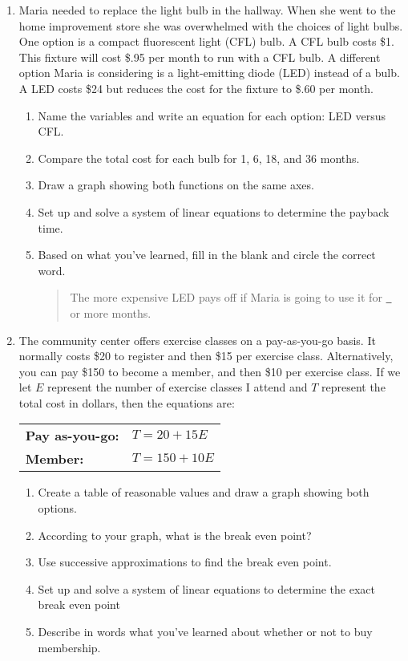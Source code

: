 \begin{enumerate}
\item Maria needed to replace the light bulb in the hallway.  When she went to the home improvement store she was overwhelmed with the choices of light bulbs.  One option is a compact fluorescent light  (CFL) bulb.  A CFL bulb costs \$1.  This fixture will cost \$.95 per month to run with a CFL bulb.  A different option Maria is considering is a light-emitting diode (LED) instead of a bulb.  A LED costs \$24 but reduces the cost for the fixture to  \$.60 per month.    
\begin{enumerate}
\item Name the variables and write an equation for each option: LED versus CFL.
\item Compare the total cost for each bulb for 1, 6, 18, and 36 months.
\item Draw a graph showing both functions on the same axes.
\item Set up and solve a system of linear equations to determine the payback time.
\item Based on what you've learned, fill in the blank and circle the correct word.
\begin{quote}
The more expensive LED pays off if Maria is going to use it for \underline{\quad~}  or more months.  
\end{quote}
\end{enumerate}

\item The community center offers exercise classes on a pay-as-you-go basis.  It normally costs \$20 to register and then \$15 per exercise class.  Alternatively, you can pay \$150 to become a member, and then \$10 per exercise class.  If we let $E$ represent the number of exercise classes I attend and $T$ represent the total cost in dollars, then the equations are:
\begin{center}
\begin{tabular} {ll}
\textbf{Pay as-you-go:} & $T = 20 + 15E$ \\
\textbf{Member:} & $T= 150 + 10E$ \\ 
\end{tabular}
\end{center}  
\begin{enumerate}
\item Create a table of reasonable values and draw a graph showing both options.
\item According to your graph, what is the break even point?  
\item Use successive approximations to find the break even point.
\item Set up and solve a system of linear equations to determine the exact break even point
\item Describe in words what you've learned about whether or not to buy membership.
\end{enumerate}


\end{enumerate}
